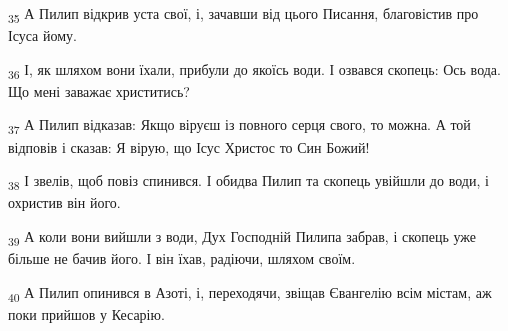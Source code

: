 \begin{tcolorbox}
\textsubscript{35} А Пилип відкрив уста свої, і, зачавши від цього Писання, благовістив про Ісуса йому.
\end{tcolorbox}
\begin{tcolorbox}
\textsubscript{36} І, як шляхом вони їхали, прибули до якоїсь води. І озвався скопець: Ось вода. Що мені заважає христитись?
\end{tcolorbox}
\begin{tcolorbox}
\textsubscript{37} А Пилип відказав: Якщо віруєш із повного серця свого, то можна. А той відповів і сказав: Я вірую, що Ісус Христос то Син Божий!
\end{tcolorbox}
\begin{tcolorbox}
\textsubscript{38} І звелів, щоб повіз спинився. І обидва Пилип та скопець увійшли до води, і охристив він його.
\end{tcolorbox}
\begin{tcolorbox}
\textsubscript{39} А коли вони вийшли з води, Дух Господній Пилипа забрав, і скопець уже більше не бачив його. І він їхав, радіючи, шляхом своїм.
\end{tcolorbox}
\begin{tcolorbox}
\textsubscript{40} А Пилип опинився в Азоті, і, переходячи, звіщав Євангелію всім містам, аж поки прийшов у Кесарію.
\end{tcolorbox}

